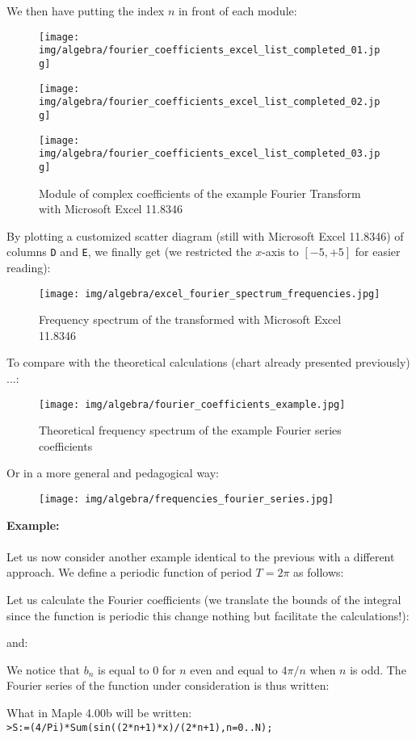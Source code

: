 	We then have putting the index $n$ in front of each module:
	\begin{figure}[H]
		\centering
		\texttt{[image: img/algebra/fourier\_coefficients\_excel\_list\_completed\_01.jpg]}
	\end{figure}
	\begin{figure}[H]
		\centering
		\texttt{[image: img/algebra/fourier\_coefficients\_excel\_list\_completed\_02.jpg]}
	\end{figure}
	\begin{figure}[H]
		\centering
		\texttt{[image: img/algebra/fourier\_coefficients\_excel\_list\_completed\_03.jpg]}
		\caption[]{Module of complex coefficients of the example Fourier Transform with Microsoft Excel 11.8346}
	\end{figure}
	By plotting a customized scatter diagram (still with  Microsoft Excel 11.8346) of columns \texttt{D} and \texttt{E}, we finally get (we restricted the $x$-axis to $[-5, +5]$ for easier reading):
	\begin{figure}[H]
		\centering
		\texttt{[image: img/algebra/excel\_fourier\_spectrum\_frequencies.jpg]}
		\caption[]{Frequency spectrum of the transformed with Microsoft Excel 11.8346}
	\end{figure}
	To compare with the theoretical calculations (chart already presented previously) ...:
	\begin{figure}[H]
		\centering
		\texttt{[image: img/algebra/fourier\_coefficients\_example.jpg]}
		\caption{Theoretical frequency spectrum of the example Fourier series coefficients}
	\end{figure}
	Or in a more general and pedagogical way:
	\begin{figure}[H]
		\centering
		\texttt{[image: img/algebra/frequencies\_fourier\_series.jpg]}
	\end{figure}
	\begin{tcolorbox}[colframe=black,colback=white,sharp corners]
	\textbf{{\Large {}}Example:}\\\\
	Let us now consider another example identical to the previous with a different approach. We define a periodic function of period $T=2\pi$ as follows:
	
	Let us calculate the Fourier coefficients (we translate the bounds of the integral since the function is periodic this change nothing but facilitate the calculations!):
	
	and:
	
	We notice that $b_n$ is equal to $0$ for $n$ even and equal to $4\pi/n$ when $n$ is odd.
	The Fourier series of the function under consideration is thus written:
	
	What in Maple 4.00b will be written:\\
	
	\texttt{>S:=(4/Pi)*Sum(sin((2*n+1)*x)/(2*n+1),n=0..N);}
	\end{tcolorbox}
	
